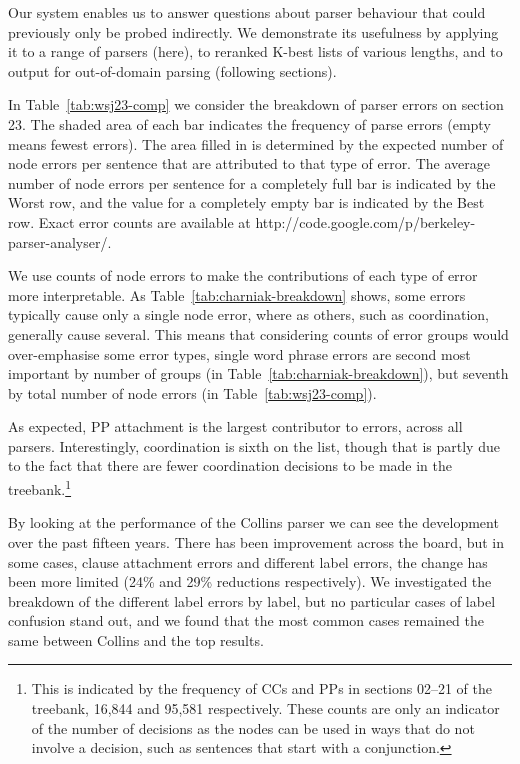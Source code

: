 Our system enables us to answer questions about parser behaviour that could
previously only be probed indirectly.  We demonstrate its usefulness by
applying it to a range of parsers (here), to reranked K-best lists of various
lengths, and to output for out-of-domain parsing (following sections).

In Table~\ref{tab:wsj23-comp} we consider the breakdown of parser errors on
\wsj section 23.  The shaded area of each bar indicates the frequency of parse
errors (\ie empty means fewest errors).  The area filled in is determined by
the expected number of node errors per sentence that are attributed to that
type of error.  The average number of node errors per sentence for a completely
full bar is indicated by the Worst row, and the value for a completely empty
bar is indicated by the Best row. Exact error counts are available at
http://code.google.com/p/berkeley-parser-analyser/.

We use counts of node errors to make the contributions of each type of error
more interpretable.  As Table~\ref{tab:charniak-breakdown} shows, some errors
typically cause only a single node error, where as others, such as
coordination, generally cause several.  This means that considering counts of
error groups would over-emphasise some error types, \eg single word phrase
errors are second most important by number of groups (in
Table~\ref{tab:charniak-breakdown}), but seventh by total number of node errors
(in Table~\ref{tab:wsj23-comp}).


As expected, PP attachment is the largest contributor to errors, across all
parsers.  Interestingly, coordination is sixth on the list, though that is
partly due to the fact that there are fewer coordination decisions to be made
in the treebank.\footnote{This is indicated by the frequency of CCs and PPs in
sections 02--21 of the treebank, 16,844 and 95,581 respectively.  These counts
are only an indicator of the number of decisions as the nodes can be used in
ways that do not involve a decision, such as sentences that start with a
conjunction.}

By looking at the performance of the Collins parser we can see the development
over the past fifteen years.  There has been improvement across
the board, but in some cases, \eg clause attachment errors and different label
errors, the change has been more limited (24\% and 29\% reductions respectively).  We
investigated the breakdown of the different label errors by label, but no
particular cases of label confusion stand out, and we found that the most
common cases remained the same between Collins and the top results.

